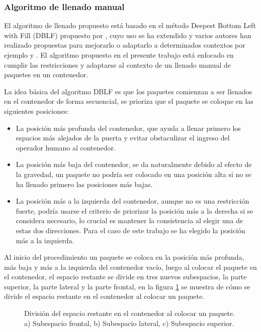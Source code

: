 \subsubsection{Algoritmo de llenado manual}

El algoritmo de llenado propuesto está basado en el método Deepest Bottom Left with Fill (DBLF) propuesto por \cite{karabulut2004hybrid}, cuyo uso se ha extendido y varios autores han realizado propuestas para mejorarlo o adaptarlo a determinados contextos por ejemplo \cite{wang2010hybrid} y \cite{kang2012hybrid}. El algoritmo propuesto en el presente trabajo está enfocado en cumplir las restricciones y adaptarse al contexto de un llenado manual de paquetes en un contenedor.

La idea básica del algoritmo DBLF es que los paquetes comienzan a ser llenados en el contenedor de forma secuencial, se prioriza que el paquete se coloque en las siguientes posiciones:

\begin{itemize}
    \item La posición más profunda del contenedor, que ayuda a llenar primero los espacios más alejados de la puerta y evitar obstaculizar el ingreso del operador humano al contenedor.
    \item La posición más baja del contenedor, se da naturalmente debido al efecto de la gravedad, un paquete no podría ser colocado en una posición alta si no se ha llenado primero las posiciones más bajas.
    \item La posición más a la izquierda del contenedor, aunque no es una restricción fuerte, podría usarse el criterio de priorizar la posición más a la derecha si se considera necesario, lo crucial es mantener la consistencia al elegir una de estas dos direcciones. Para el caso de este trabajo se ha elegido la posición más a la izquierda.
\end{itemize}

Al inicio del procedimiento un paquete se coloca en la posición más profunda, más baja y más a la izquierda del contenedor vacío, luego al colocar el paquete en el contenedor, el espacio restante se divide en tres nuevos subespacios, la parte superior, la parte lateral y la parte frontal, en la figura \ref{fig:subespacios} se muestra de cómo se divide el espacio restante en el contenedor al colocar un paquete.

\begin{figure}[H]
    \centering
    
    \caption{División del espacio restante en el contenedor al colocar un paquete. a) Subespacio frontal, b) Subespacio lateral, c) Subespacio superior.}
    \label{fig:subespacios}
\end{figure}

